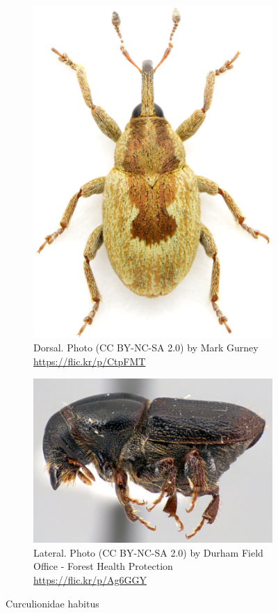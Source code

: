 \documentclass[letterpaper, 11pt]{article}
\begin{document}
\begin{figure}[ht!]
  \centering
\begin{subfigure}[ht!]{0.31\textwidth}
    \includegraphics[width=\textwidth]{Curculionid1}
  \caption{Dorsal. Photo (CC BY-NC-SA 2.0) by Mark Gurney \url{https://flic.kr/p/CtpFMT}}
  \label{fig:curculionid1}
\end{subfigure}
    \qquad
\begin{subfigure}[ht!]{0.5\textwidth}
    \includegraphics[width=\textwidth]{Curculionid4}
  \caption{Lateral. Photo (CC BY-NC-SA 2.0) by Durham Field Office - Forest Health Protection \url{https://flic.kr/p/Ag6GGY}}
  \label{fig:curculionid2}
\end{subfigure}
    \caption{Curculionidae habitus}\label{fig:curculionids}
\end{figure}
\end{document}
